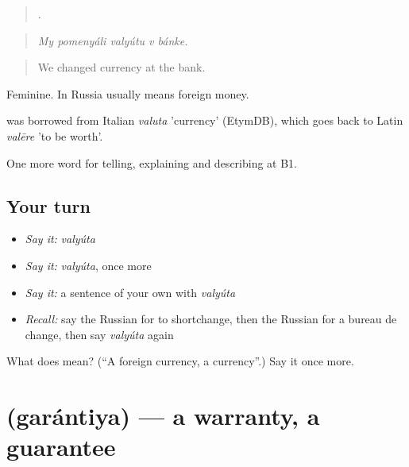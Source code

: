 \begin{quote}
    .
\end{quote}

\begin{quote}
\emph{My pomenyáli valyútu v bánke.}
\end{quote}

\begin{quote}
We changed currency at the bank.
\end{quote}

Feminine. In Russia \emph{} usually means foreign money.

\begin{cousinweb}
\emph{} was borrowed from Italian \emph{valuta} 'currency' (EtymDB), which goes back to Latin \emph{valēre} 'to be worth'.
\end{cousinweb}

\begin{grammarlens}[title={What you've built}]
One more word for telling, explaining and describing at B1.
\end{grammarlens}

\subsection*{Your turn}
\begin{itemize}
\raggedright
  \item \emph{Say it:} \emph{valyúta}
  \item \emph{Say it:} \emph{valyúta}, once more
  \item \emph{Say it:} a sentence of your own with \emph{valyúta}
  \item \emph{Recall:} say the Russian for to shortchange, then the Russian for a bureau de change, then say \emph{valyúta} again
\end{itemize}

\begin{tcolorbox}[breakable,colback=teal!4,colframe=teal!35!black,title={Before you move on}]
What does  mean? (\textquotedblleft{}A foreign currency, a currency\textquotedblright{}.) Say it once more.
\end{tcolorbox}
\section[\texorpdfstring{\ru{гарантия} (garántiya)}{гарантия (garántiya)}]{ (garántiya) — a warranty, a guarantee}

